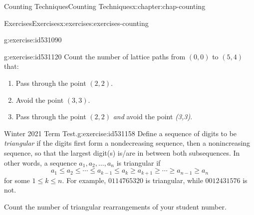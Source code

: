 \documentclass[oneside,10pt,]{book}
\numberwithin{equation}{section}
\begin{document}
\begin{chapterptx}{Counting Techniques}{}{Counting Techniques}{}{}{x:chapter:chap-counting}
\begin{exercises-section}{Exercises}{}{Exercises}{}{}{x:exercises:exercises-counting}
\begin{divisionexercise}{14}{}{}{g:exercise:id531090}
\begin{sidebyside}{3}{0.0916666666666667}{0.0916666666666667}{0.183333333333333}
\begin{sbspanel}{0.15}
%
\end{sbspanel}%
\end{sidebyside}%
\end{divisionexercise}%
\begin{divisionexercise}{15}{}{}{g:exercise:id531120}%
Count the number of lattice paths from \((0,0)\) to \((5,4)\) that:%
\begin{enumerate}[label=(\alph*)]
\item{}Pass through the point \((2,2)\).%
\item{}Avoid the point \((3,3)\).%
\item{}Pass through the point \((2,2)\) \emph{and} avoid the point \emph{(3,3)}.%
\end{enumerate}
%
\begin{sidebyside}{1}{0.3}{0.3}{0}%
\begin{sbspanel}{0.4}%
%
\end{sbspanel}%
\end{sidebyside}%
\end{divisionexercise}%
\begin{divisionexercise}{16}{Winter 2021 Term Test.}{}{g:exercise:id531158}%
Define a sequence of digits to be \emph{triangular} if the digits first form a nondecreasing sequence, then a nonincreasing sequence, so that the largest digit(s) is\slash{}are in between both subsequences. In other words, a sequence \(a_1,a_2,\ldots,a_n\) is triangular if%
\begin{equation*}
a_1 \leq a_2 \leq \cdots \leq a_{k-1} \leq a_k \geq a_{k+1} \geq \cdots \geq a_{n-1} \geq a_n
\end{equation*}
for some \(1 \leq k \leq n\). For example, \(0114765320\) is triangular, while \(0012431576\) is not.%
\par
Count the number of triangular rearrangements of your student number.%
\end{divisionexercise}%

\end{exercises-section}
\end{chapterptx}
\end{document}
